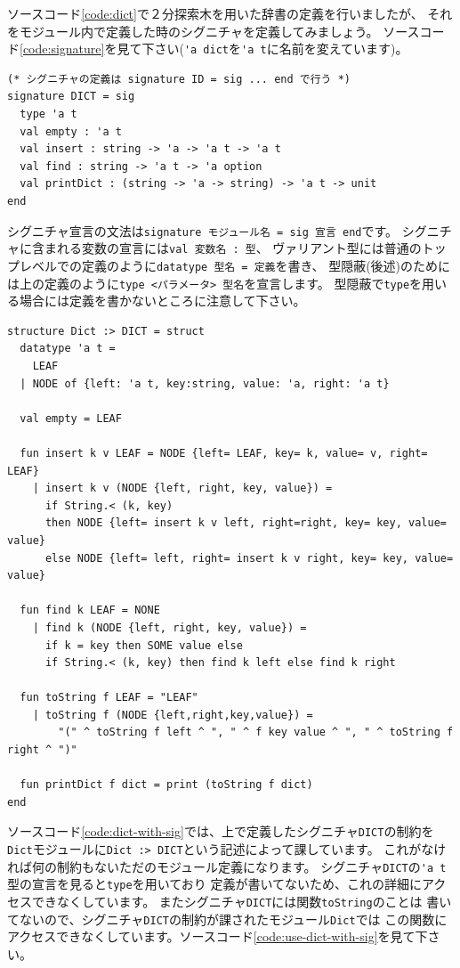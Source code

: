 \documentclass[11pt,a4paper]{article}
\begin{document}
ソースコード\ref{code:dict}で２分探索木を用いた辞書の定義を行いましたが、
それをモジュール内で定義した時のシグニチャを定義してみましょう。
ソースコード\ref{code:signature}を見て下さい(\lstinline{'a dict}を\lstinline{'a t}に名前を変えています)。

\begin{lstlisting}[caption=シグニチャの定義,label=code:signature]
(* シグニチャの定義は signature ID = sig ... end で行う *)
signature DICT = sig
  type 'a t
  val empty : 'a t
  val insert : string -> 'a -> 'a t -> 'a t
  val find : string -> 'a t -> 'a option
  val printDict : (string -> 'a -> string) -> 'a t -> unit
end
\end{lstlisting}

シグニチャ宣言の文法は\lstinline{signature モジュール名 = sig 宣言 end}です。
シグニチャに含まれる変数の宣言には\lstinline{val 変数名 : 型}、
ヴァリアント型には普通のトップレベルでの定義のように\lstinline{datatype 型名 = 定義}を書き、
型隠蔽(後述)のためには上の定義のように\lstinline{type <パラメータ> 型名}を宣言します。
型隠蔽で\lstinline{type}を用いる場合には定義を書かないところに注意して下さい。

\begin{lstlisting}[caption=モジュール\lstinline{Dict}にシグニチャを付ける,label=code:dict-with-sig]
structure Dict :> DICT = struct
  datatype 'a t =
    LEAF
  | NODE of {left: 'a t, key:string, value: 'a, right: 'a t}

  val empty = LEAF

  fun insert k v LEAF = NODE {left= LEAF, key= k, value= v, right= LEAF}
    | insert k v (NODE {left, right, key, value}) =
      if String.< (k, key)
      then NODE {left= insert k v left, right=right, key= key, value= value}
      else NODE {left= left, right= insert k v right, key= key, value= value}

  fun find k LEAF = NONE
    | find k (NODE {left, right, key, value}) =
      if k = key then SOME value else
      if String.< (k, key) then find k left else find k right

  fun toString f LEAF = "LEAF"
    | toString f (NODE {left,right,key,value}) =
        "(" ^ toString f left ^ ", " ^ f key value ^ ", " ^ toString f right ^ ")"

  fun printDict f dict = print (toString f dict)
end
\end{lstlisting}

ソースコード\ref{code:dict-with-sig}では、上で定義したシグニチャ\lstinline{DICT}の制約を
\lstinline{Dict}モジュールに\lstinline{Dict :> DICT}という記述によって課しています。
これがなければ何の制約もないただのモジュール定義になります。
シグニチャ\lstinline{DICT}の\lstinline{'a t}型の宣言を見ると\lstinline{type}を用いており
定義が書いてないため、これの詳細にアクセスできなくしています。
またシグニチャ\lstinline{DICT}には関数\lstinline{toString}のことは
書いてないので、シグニチャ\lstinline{DICT}の制約が課されたモジュール\lstinline{Dict}では
この関数にアクセスできなくしています。ソースコード\ref{code:use-dict-with-sig}を見て下さい。
\end{document}
